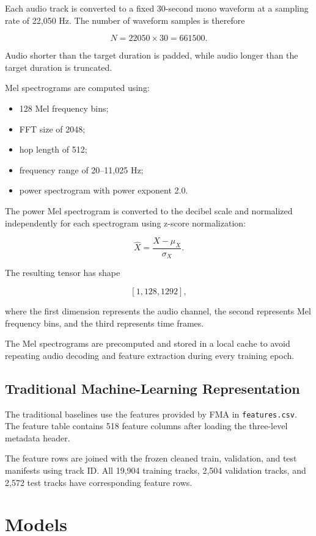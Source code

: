 \documentclass[11pt,a4paper]{article}
\begin{document}
Each audio track is converted to a fixed 30-second mono waveform at a sampling rate of 22,050 Hz. The number of waveform samples is therefore

\[
N = 22050 \times 30 = 661500.
\]

Audio shorter than the target duration is padded, while audio longer than the target duration is truncated.

Mel spectrograms are computed using:

\begin{itemize}
    \item 128 Mel frequency bins;
    \item FFT size of 2048;
    \item hop length of 512;
    \item frequency range of 20--11,025 Hz;
    \item power spectrogram with power exponent 2.0.
\end{itemize}

The power Mel spectrogram is converted to the decibel scale and normalized independently for each spectrogram using z-score normalization:

\[
\hat{X} = \frac{X-\mu_X}{\sigma_X}.
\]

The resulting tensor has shape

\[
[1,128,1292],
\]

where the first dimension represents the audio channel, the second represents Mel frequency bins, and the third represents time frames.

The Mel spectrograms are precomputed and stored in a local cache to avoid repeating audio decoding and feature extraction during every training epoch.

\subsection{Traditional Machine-Learning Representation}

The traditional baselines use the features provided by FMA in \texttt{features.csv}. The feature table contains 518 feature columns after loading the three-level metadata header.

The feature rows are joined with the frozen cleaned train, validation, and test manifests using track ID. All 19,904 training tracks, 2,504 validation tracks, and 2,572 test tracks have corresponding feature rows.

\section{Models}
\end{document}
